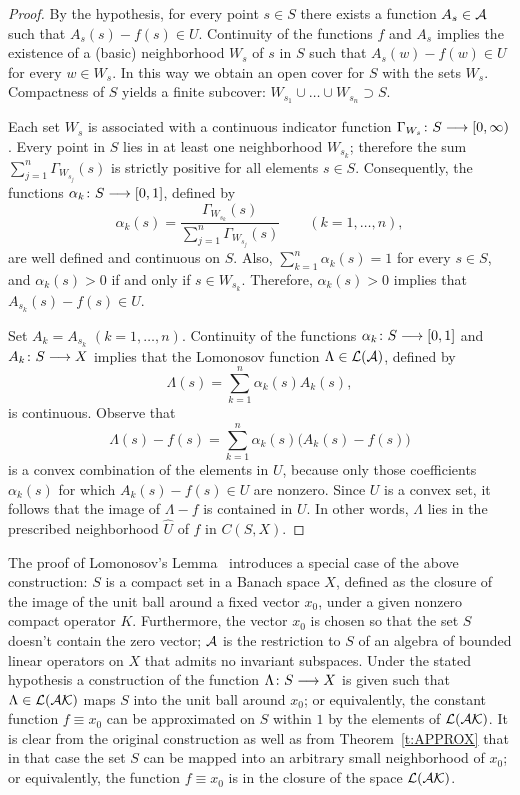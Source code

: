 \begin{proof}
By the hypothesis, for every point $s\in{S}$ there exists a function
$A_s\in{\cal A}$ such that $A_s(s)-f(s)\in{U}$. Continuity of the functions $f$ and
$A_s$ implies the existence of a (basic) neighborhood $W_s$ of $s$ in $S$
such that $A_s(w)-f(w)\in{U}$ for every $w\in{W_s}$. In this way we obtain an
open cover for $S$ with the sets $W_s$. Compactness of $S$ yields a finite
subcover: $W_{s_1}\cup\ldots\cup{W_{s_n}}\supset{S}$.

\smallskip

Each set $W_s$ is associated with a continuous indicator function
$\Gamma_{W_s}\colon S \longrightarrow [0,\infty)$. Every point in $S$ lies in at least one
neighborhood $W_{s_k}$; therefore the sum $\sum_{j=1}^n \Gamma_{W_{s_j}}(s)$
is strictly positive for all elements $s \in S$. Consequently, the functions
$\alpha_k\colon S \longrightarrow [0,1]$, defined by
\[ \alpha_k(s) =
   \frac{\Gamma_{W_{s_k}}(s)}{\sum_{j=1}^n \Gamma_{W_{s_j}}(s)}
   \quad\quad   (k=1,\ldots,n), \]
are well defined and continuous on $S$. Also, $\sum_{k=1}^n\alpha_k(s)=1$ for
every $s \in S$, and $\alpha_k(s)>0$ if and only if $s \in W_{s_k}$.
Therefore, $\alpha_k(s)>0$ implies that $A_{s_k}(s)-f(s)\in{U}$.

Set $A_k=A_{s_k}$ $(k=1,\ldots,n)$. Continuity of the functions
$\alpha_k\colon S\longrightarrow[0,1]$ and $A_k\colon S \longrightarrow X$ implies that the Lomonosov
function $\Lambda\in\cal{L}({\cal A})$, defined by
\[ \Lambda(s) = \sum_{k=1}^n \alpha_k(s) A_k(s), \]
is continuous. Observe that
\[ \Lambda(s) - f(s) = \sum_{k=1}^n \alpha_k(s)
       \big(A_k(s)-f(s)\big) \]
is a convex combination of the elements in $U$, because only those
coefficients $\alpha_k(s)$ for which $A_k(s)-f(s)\in{U}$ are nonzero. Since
$U$ is a convex set, it follows that the image of $\Lambda-f$ is contained in
$U$. In other words, $\Lambda$ lies in the prescribed neighborhood
$\widehat{U}$ of $f$ in $C(S,X)$.
\end{proof}

\smallskip

\begin{rem}
The proof of Lomonosov's Lemma~\cite{Lom73,RR73} introduces a special case of
the above construction: $S$ is a compact set in a Banach space $X$, defined
as the closure of the image of the unit ball around a fixed vector $x_0$,
under a given nonzero compact operator $K$. Furthermore, the vector $x_0$ is
chosen so that the set $S$ doesn't contain the zero vector; ${\cal A}$ is the
restriction to $S$ of an algebra of bounded linear operators on $X$ that
admits no invariant subspaces. Under the stated hypothesis a construction of
the function $\Lambda\colon{S}\longrightarrow{X}$ is given such that
$\Lambda\in\cal{L}({\cal A}{K})$ maps $S$ into the unit ball around $x_0$; or
equivalently, the constant function $f\equiv{x_0}$ can be approximated on $S$
within $1$ by the elements of $\cal{L}({\cal A}{K})$. It is clear from the original
construction as well as from Theorem~\ref{t:APPROX} that in that case the set
$S$ can be mapped into an arbitrary small neighborhood of $x_0$; or
equivalently, the function $f\equiv{x_0}$ is in the closure of the space
$\cal{L}({\cal A}{K})$.
\end{rem}


